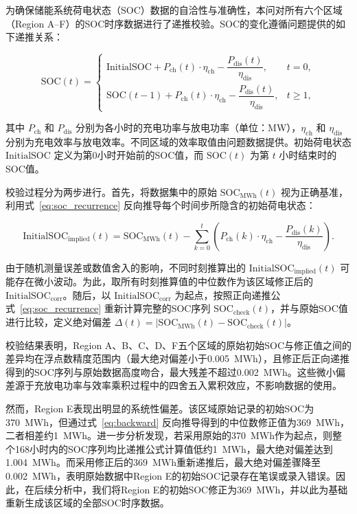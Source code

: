 \documentclass[UTF8,a4paper,zihao=-4]{ctexart}
\begin{document}
为确保储能系统荷电状态（SOC）数据的自洽性与准确性，本问对所有六个区域（Region A--F）的SOC时序数据进行了递推校验。SOC的变化遵循问题提供的如下递推关系：

\begin{equation}
\mathrm{SOC}(t) = 
\begin{cases}
\mathrm{InitialSOC} + P_{\mathrm{ch}}(t) \cdot \eta_{\mathrm{ch}} - \dfrac{P_{\mathrm{dis}}(t)}{\eta_{\mathrm{dis}}}, & t=0,\\[8pt]
\mathrm{SOC}(t-1) + P_{\mathrm{ch}}(t) \cdot \eta_{\mathrm{ch}} - \dfrac{P_{\mathrm{dis}}(t)}{\eta_{\mathrm{dis}}}, & t \geq 1,
\end{cases}
\label{eq:soc_recurrence}
\end{equation}

其中 $P_{\mathrm{ch}}$ 和 $P_{\mathrm{dis}}$ 分别为各小时的充电功率与放电功率（单位：MW），$\eta_{\mathrm{ch}}$ 和 $\eta_{\mathrm{dis}}$ 分别为充电效率与放电效率。不同区域的效率取值由问题数据提供。初始荷电状态 $\mathrm{InitialSOC}$ 定义为第0小时开始前的SOC值，而 $\mathrm{SOC}(t)$ 为第 $t$ 小时结束时的SOC值。

校验过程分为两步进行。首先，将数据集中的原始 $\mathrm{SOC}_{\mathrm{MWh}}(t)$ 视为正确基准，利用式~\eqref{eq:soc_recurrence} 反向推导每个时间步所隐含的初始荷电状态：

\begin{equation}
\mathrm{InitialSOC}_{\mathrm{implied}}(t) = \mathrm{SOC}_{\mathrm{MWh}}(t) - \sum_{k=0}^{t} \left( P_{\mathrm{ch}}(k) \cdot \eta_{\mathrm{ch}} - \frac{P_{\mathrm{dis}}(k)}{\eta_{\mathrm{dis}}} \right).
\label{eq:backward}
\end{equation}

由于随机测量误差或数值舍入的影响，不同时刻推算出的 $\mathrm{InitialSOC}_{\mathrm{implied}}(t)$ 可能存在微小波动。为此，取所有时刻推算值的中位数作为该区域修正后的$\mathrm{InitialSOC}_{\mathrm{corr}}$。随后，以 $\mathrm{InitialSOC}_{\mathrm{corr}}$ 为起点，按照正向递推公式~\eqref{eq:soc_recurrence} 重新计算完整的SOC序列 $\mathrm{SOC}_{\mathrm{check}}(t)$，并与原始SOC值进行比较，定义绝对偏差 $\Delta(t) = |\mathrm{SOC}_{\mathrm{MWh}}(t) - \mathrm{SOC}_{\mathrm{check}}(t)|$。

校验结果表明，Region A、B、C、D、F五个区域的原始初始SOC与修正值之间的差异均在浮点数精度范围内（最大绝对偏差小于0.005~MWh），且修正后正向递推得到的SOC序列与原始数据高度吻合，最大残差不超过0.002~MWh。这些微小偏差源于充放电功率与效率乘积过程中的四舍五入累积效应，不影响数据的使用。

然而，Region E表现出明显的系统性偏差。该区域原始记录的初始SOC为370~MWh，但通过式~\eqref{eq:backward} 反向推导得到的中位数修正值为369~MWh，二者相差约1~MWh。进一步分析发现，若采用原始的370~MWh作为起点，则整个168小时内的SOC序列均比递推公式计算值低约1~MWh，最大绝对偏差达到1.004~MWh。而采用修正后的369~MWh重新递推后，最大绝对偏差骤降至0.002~MWh，表明原始数据中Region E的初始SOC记录存在笔误或录入错误。因此，在后续分析中，我们将Region E的初始SOC修正为369~MWh，并以此为基础重新生成该区域的全部SOC时序数据。
\end{document}
